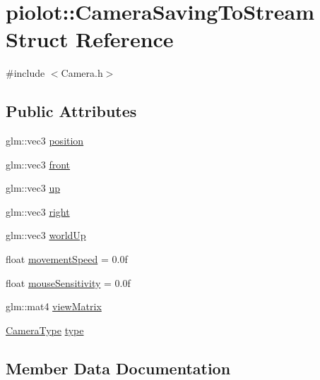 \hypertarget{structpiolot_1_1_camera_saving_to_stream}{}\section{piolot\+:\+:Camera\+Saving\+To\+Stream Struct Reference}
\label{structpiolot_1_1_camera_saving_to_stream}


{\ttfamily \#include $<$Camera.\+h$>$}

\subsection*{Public Attributes}
\begin{DoxyCompactItemize}
\item 
glm\+::vec3 \mbox{\hyperlink{structpiolot_1_1_camera_saving_to_stream_a04a032f3c0e8cd93881ce17213bbf4bd}{position}}
\item 
glm\+::vec3 \mbox{\hyperlink{structpiolot_1_1_camera_saving_to_stream_abe0eb65d9c73092e1568f84db1a2aee5}{front}}
\item 
glm\+::vec3 \mbox{\hyperlink{structpiolot_1_1_camera_saving_to_stream_a43f2e1bbaaf6bc3b5ccebbe413b25971}{up}}
\item 
glm\+::vec3 \mbox{\hyperlink{structpiolot_1_1_camera_saving_to_stream_a7fcc0104c11130ecab709a89768c502c}{right}}
\item 
glm\+::vec3 \mbox{\hyperlink{structpiolot_1_1_camera_saving_to_stream_acafc5157ece98eb00acf67acb5b66c88}{world\+Up}}
\item 
float \mbox{\hyperlink{structpiolot_1_1_camera_saving_to_stream_ad61906be234d7d739202791be26a2da0}{movement\+Speed}} = 0.\+0f
\item 
float \mbox{\hyperlink{structpiolot_1_1_camera_saving_to_stream_aef4782e4042bf00c1bb25e9d22fe3ae1}{mouse\+Sensitivity}} = 0.\+0f
\item 
glm\+::mat4 \mbox{\hyperlink{structpiolot_1_1_camera_saving_to_stream_a4baad4cac5a766612ef07e244670b7cc}{view\+Matrix}}
\item 
\mbox{\hyperlink{namespacepiolot_a8ffac0a73d973fb66879963da5defc90}{Camera\+Type}} \mbox{\hyperlink{structpiolot_1_1_camera_saving_to_stream_a1c07deec7b00d9a0fcaa9a5faf316981}{type}}
\end{DoxyCompactItemize}


\subsection{Member Data Documentation}
\mbox{\label{structpiolot_1_1_camera_saving_to_stream_abe0eb65d9c73092e1568f84db1a2aee5}} 
